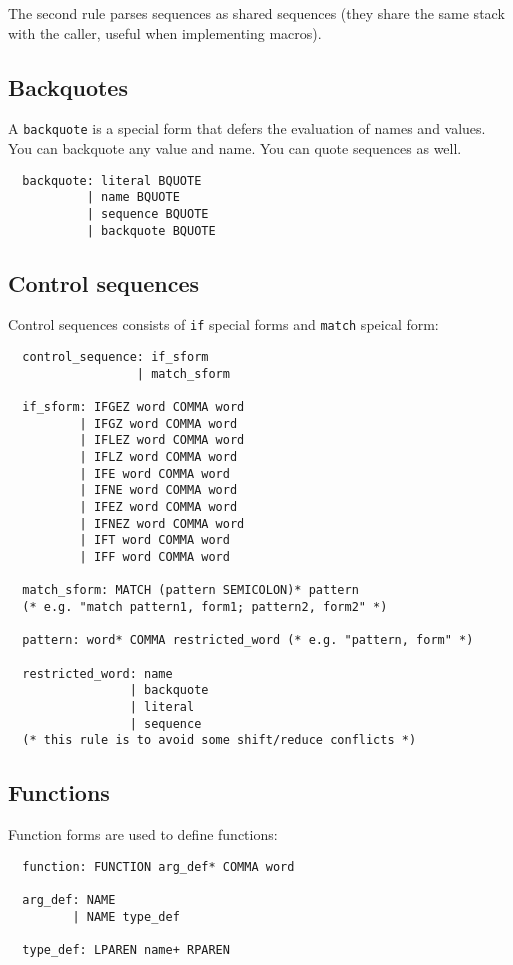 \documentclass{article}
\begin{document}
The second rule parses sequences as shared sequences (they share the same stack with the caller, useful when implementing macros).

\subsection{Backquotes}

A \texttt{backquote} is a special form that defers the evaluation of names and values. You can backquote any value and name. You can quote sequences as well.
\begin{verbatim}
  backquote: literal BQUOTE
           | name BQUOTE
           | sequence BQUOTE
           | backquote BQUOTE
\end{verbatim}

\subsection{Control sequences}

Control sequences consists of \texttt{if} special forms and \texttt{match} speical form:
\begin{verbatim}
  control_sequence: if_sform
                  | match_sform

  if_sform: IFGEZ word COMMA word
          | IFGZ word COMMA word
          | IFLEZ word COMMA word
          | IFLZ word COMMA word
          | IFE word COMMA word
          | IFNE word COMMA word
          | IFEZ word COMMA word
          | IFNEZ word COMMA word
          | IFT word COMMA word
          | IFF word COMMA word

  match_sform: MATCH (pattern SEMICOLON)* pattern
  (* e.g. "match pattern1, form1; pattern2, form2" *)

  pattern: word* COMMA restricted_word (* e.g. "pattern, form" *)

  restricted_word: name
                 | backquote
                 | literal
                 | sequence
  (* this rule is to avoid some shift/reduce conflicts *)
\end{verbatim}

\subsection{Functions}

Function forms are used to define functions:
\begin{verbatim}
  function: FUNCTION arg_def* COMMA word

  arg_def: NAME
         | NAME type_def

  type_def: LPAREN name+ RPAREN
\end{verbatim}
\end{document}
